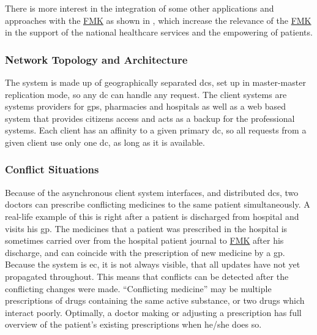 There is more interest in the integration of some other applications and approaches with the \href{https://www.trifork.com/news/a-prestigious-prize-trifork-public}{FMK} as shown in \cite{Urazimbetov2012a, Hansen2011a}, which increase the relevance of the \href{https://www.trifork.com/news/a-prestigious-prize-trifork-public}{FMK} in the support of the national healthcare services and the empowering of patients.


\subsubsection{Network Topology and Architecture }
The system is made up of geographically separated \glspl{dc}, set up in master-master replication mode, so any \gls{dc} can handle any request. The client systems are systems providers for \glspl{gp}, pharmacies and hospitals as well as a web based system that provides citizens access and acts as a backup for the professional systems. Each client has an affinity to a given primary \gls{dc}, so all requests from a given client use only one \gls{dc}, as long as it is available.


\subsubsection{Conflict Situations}
Because of the asynchronous client system interfaces, and distributed \glspl{dc}, two doctors can prescribe conflicting medicines to the same patient simultaneously. A real-life example of this is right after a patient is discharged from hospital and visits his \gls{gp}. The medicines that a patient was prescribed in the hospital is sometimes carried over from the hospital patient journal to \href{https://www.trifork.com/news/a-prestigious-prize-trifork-public}{FMK} after his discharge, and can coincide with the prescription of new medicine by a \gls{gp}. Because the system is \gls{ec}, it is not always visible, that all updates have not yet propagated throughout. This means that conflicts can be detected after the conflicting changes were made. \textquotedblleft Conflicting medicine\textquotedblright{} may be multiple prescriptions of drugs containing the same active substance, or two drugs which interact poorly. Optimally, a doctor making or adjusting a prescription has full overview of the patient\textquoteright s existing prescriptions when he/she does so.


